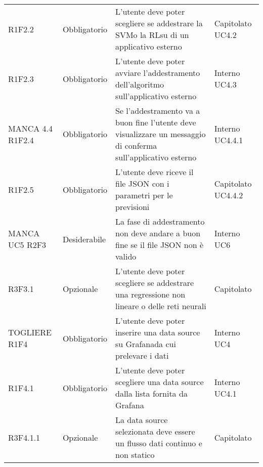 \begin{longtable} {
		>{}p{24mm} 
		>{}p{32mm}
		>{}p{40mm} 
		>{}p{24.5mm}
		}
		R1F2.2 & Obbligatorio & L'utente deve poter scegliere se addestrare la SVM\glosp o la RL\glosp su di un applicativo esterno & Capitolato UC4.2 \TBstrut \\ [2mm]		
		R1F2.3 & Obbligatorio & L'utente deve poter avviare l'addestramento dell'algoritmo sull'applicativo esterno & Interno UC4.3 \TBstrut \\ [2mm]
		MANCA 4.4
		R1F2.4 & Obbligatorio & Se l'addestramento va a buon fine l'utente deve visualizzare un messaggio di conferma sull'applicativo esterno & Interno UC4.4.1 \TBstrut \\ [2mm]
		R1F2.5 & Obbligatorio & L'utente deve riceve il file JSON con i parametri per le previsioni & Capitolato UC4.4.2 \TBstrut \\ [2mm]
		MANCA UC5
		R2F3 & Desiderabile & La fase di addestramento non deve andare a buon fine se il file JSON non è valido & Interno UC6 \TBstrut \\ [2mm]
		R3F3.1 & Opzionale & L'utente deve poter scegliere se addestrare una regressione non lineare o delle reti neurali\glo & Capitolato \TBstrut \\ [2mm]
		
		
	TOGLIERE
		R1F4 & Obbligatorio & L'utente deve poter inserire una data source su Grafana\glosp da cui prelevare i dati & Interno UC4 \TBstrut \\ [2mm]
		R1F4.1 & Obbligatorio & L'utente deve poter scegliere una data source dalla lista fornita da Grafana\glo & Interno UC4.1 \TBstrut \\ [2mm]
		
		R3F4.1.1 & Opzionale & La data source selezionata deve essere un flusso dati continuo e non statico & Capitolato \TBstrut \\ [2mm]
		

\end{longtable}
